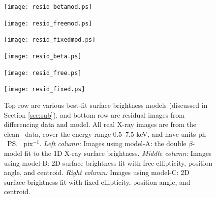 \begin{figure}
  \begin{center}
    \begin{minipage}{0.33\linewidth}
      \texttt{[image: resid\_betamod.ps]}
    \end{minipage}
    \begin{minipage}{0.33\linewidth}
      \texttt{[image: resid\_freemod.ps]}
    \end{minipage}
    \begin{minipage}{0.33\linewidth}
      \texttt{[image: resid\_fixedmod.ps]}
    \end{minipage}
    \begin{minipage}{0.33\linewidth}
      \texttt{[image: resid\_beta.ps]}
    \end{minipage}
    \begin{minipage}{0.33\linewidth}
      \texttt{[image: resid\_free.ps]}
    \end{minipage}
    \begin{minipage}{0.33\linewidth}
      \texttt{[image: resid\_fixed.ps]}
    \end{minipage}
    \caption{Top row are various best-fit surface brightness models
      (discussed in Section \ref{sec:sub}), and bottom row are
      residual images from differencing data and model. All real X-ray
      images are from the clean \cxo\ data, cover the energy range
      0.5--7.5 keV, and have units ph \pcmsq\ \ps\ pix$^{-1}$. {\it
        Left column:} Images using model-A: the double $\beta$-model
      fit to the 1D X-ray surface brightness. {\it Middle column:}
      Images using model-B: 2D surface brightness fit with free
      ellipticity, position angle, and centroid. {\it Right column:}
      Images using model-C: 2D surface brightness fit with fixed
      ellipticity, position angle, and centroid.}
    \label{fig:multiresid}
  \end{center}
\end{figure}

